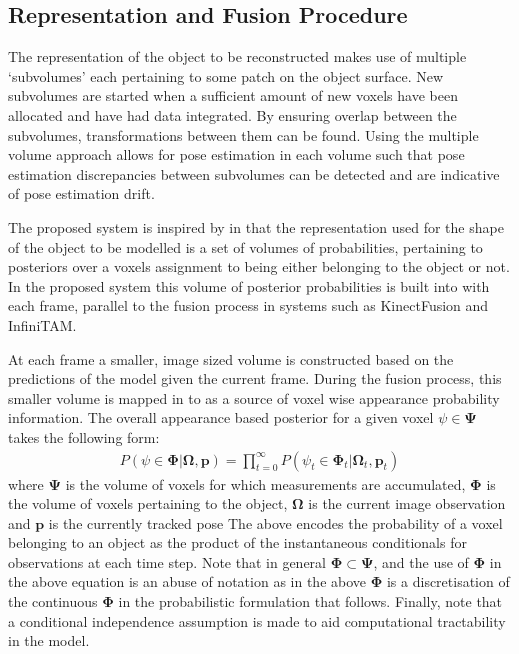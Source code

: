 \subsection{Representation and Fusion Procedure}
The representation of the object to be reconstructed makes use of multiple `subvolumes' each pertaining to some patch on the object surface. 
New subvolumes are started when a sufficient amount of new voxels have been allocated and have had data integrated. By ensuring overlap 
between the subvolumes, transformations between them can be found. Using the multiple volume approach allows for pose estimation in each 
volume such that pose estimation discrepancies between subvolumes can be detected and are indicative of pose estimation drift.

The proposed system is inspired by\cite{Kolev2006} in that the representation used for the shape of the object to be modelled is a set of volumes 
of probabilities, pertaining to posteriors over a voxels assignment to being either belonging to the object or not.  In the proposed system this 
volume of posterior probabilities is built into with each frame, parallel to the fusion process in systems such as KinectFusion\cite{Newcombe2011} 
and InfiniTAM\cite{Prisacariu2014}.

At each frame a smaller, image sized volume  is constructed based on the predictions of the model given the current frame. During the fusion process, this 
smaller volume is mapped in to as a source of voxel wise appearance probability information. The overall appearance based posterior for a given voxel 
$\psi \in \mathbf{\Psi}$ takes the following form:
\begin{equation}
\begin{split}
P(\psi \in \mathbf{\Phi} | \mathbf{\Omega}, \mathbf{p}) = \prod_{t=0}^{\infty} P(\psi_{t} \in \mathbf{\Phi}_{t} | \mathbf{\Omega}_{t}, \mathbf{p}_{t})
\end{split}
\end{equation}
where $\mathbf{\Psi}$ is the volume of voxels for which measurements are accumulated, $\mathbf{\Phi}$ 
is the volume of voxels pertaining to the object, $\mathbf{\Omega}$ is the current image observation and $\mathbf{p}$ is the currently tracked pose
The above encodes the probability of a voxel belonging to an object as the product of the instantaneous conditionals for observations at each time step. 
Note that in general $\mathbf{\Phi} \subset \mathbf{\Psi}$, and the use of $\mathbf{\Phi}$ in the above equation is an abuse of notation as in the above 
$\mathbf{\Phi}$ is a discretisation of the continuous $\mathbf{\Phi}$ in the probabilistic formulation that follows. Finally, note that a conditional 
independence assumption is made to aid computational tractability in the model.

